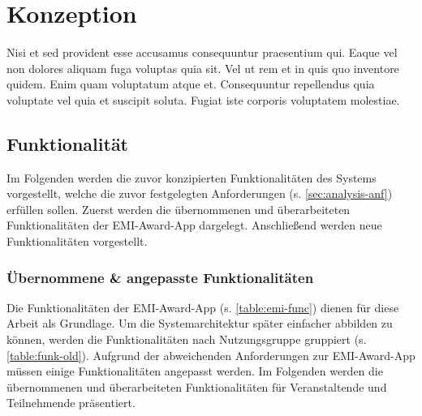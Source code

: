 \chapter{Konzeption} \label{chapter:conception}

Nisi et sed provident esse accusamus consequuntur praesentium qui. Eaque vel non dolores aliquam fuga voluptas quia sit. Vel ut rem et in quis quo inventore quidem. Enim quam voluptatum atque et. Consequuntur repellendus quia voluptate vel quia et suscipit soluta. Fugiat iste corporis voluptatem molestiae.

\section{Funktionalität} \label{sec:concept-func}

Im Folgenden werden die zuvor konzipierten Funktionalitäten des Systems
vorgestellt, welche die zuvor festgelegten Anforderungen (s.
\autoref{sec:analysis-anf}) erfüllen sollen. Zuerst werden die übernommenen und
überarbeiteten Funktionalitäten der EMI-Award-App dargelegt. Anschließend werden
neue Funktionalitäten vorgestellt.

\subsection{Übernommene \& angepasste Funktionalitäten}

Die Funktionalitäten der EMI-Award-App (s. \autoref{table:emi-func}) dienen für
diese Arbeit als Grundlage. Um die Systemarchitektur später einfacher abbilden
zu können, werden die Funktionalitäten nach Nutzungsgruppe gruppiert (s.
\autoref{table:funk-old}). Aufgrund der abweichenden Anforderungen zur
EMI-Award-App müssen einige Funktionalitäten angepasst werden. Im Folgenden
werden die übernommenen und überarbeiteten Funktionalitäten für Veranstaltende
und Teilnehmende präsentiert.

